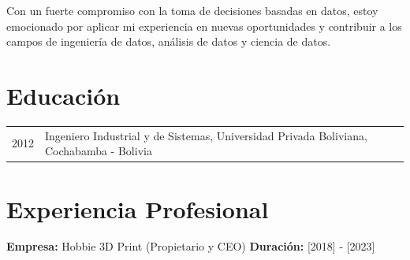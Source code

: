 \documentclass[a4paper,10pt]{article}
\begin{document}
Con un fuerte compromiso con la toma de decisiones basadas en datos, estoy emocionado por aplicar mi experiencia en nuevas oportunidades y contribuir a los campos de ingeniería de datos, análisis de datos y ciencia de datos.

\section*{Educación}
\begin{tabular}{p{3cm}p{12cm}}
    2012 & Ingeniero Industrial y de Sistemas, Universidad Privada Boliviana, Cochabamba - Bolivia \\
\end{tabular}

\section*{Experiencia Profesional}
\textbf{Empresa:} Hobbie 3D Print (Propietario y CEO)  
\textbf{Duración:} [2018] - [2023]
\end{document}
